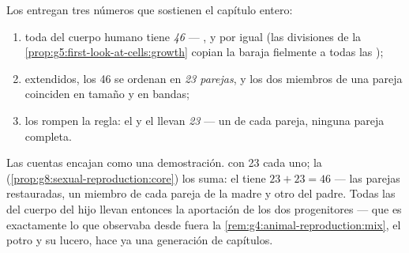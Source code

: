 \begin{proposition}\label{prop:g9:chromosomes:counts}
Los  entregan tres números que sostienen el capítulo entero:
\begin{enumerate}
  \item toda  del cuerpo humano tiene \emph{46}  ---
        ,  y  por igual (las divisiones de la
        \cref{prop:g5:first-look-at-cells:growth} copian la baraja
        fielmente a todas las );
  \item extendidos, los 46 se ordenan en \emph{23 parejas}, y los dos
        miembros de una pareja coinciden en tamaño y en bandas;
  \item los \emph{} rompen la regla: el  y el
         llevan \emph{23} --- un  de cada
        pareja, ninguna pareja completa.
\end{enumerate}
\end{proposition}
\admitted

\begin{example}\label{ex:g9:chromosomes:arithmetic}
Las cuentas encajan como una demostración.  con 23 cada uno; la
 (\cref{prop:g8:sexual-reproduction:core}) los suma: el
 tiene $23 + 23 = 46$ --- las parejas restauradas, un miembro de
cada pareja de la madre y otro del padre. Todas las  del cuerpo
del hijo llevan entonces la aportación de los dos progenitores --- que
es exactamente lo que observaba desde fuera la
\cref{rem:g4:animal-reproduction:mix}, el potro y su lucero, hace ya
una generación de capítulos.
\end{example}

